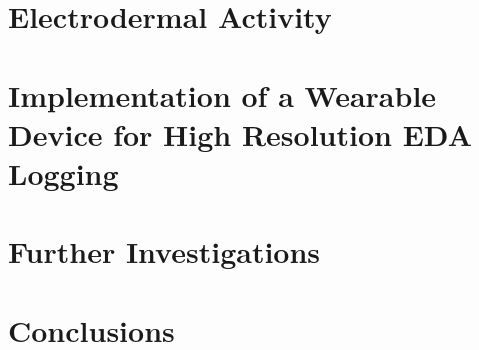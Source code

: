 \documentclass[target=bach, hidelinks]{thud}
\begin{document}
\chapter{Electrodermal Activity}


\chapter{Implementation of a Wearable Device for High Resolution EDA Logging}


\chapter{Further Investigations}


\chapter{Conclusions}


\backmatter




\end{document}
